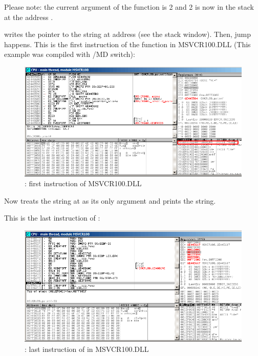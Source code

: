 Please note: the current argument of the function is 2 and 2 is now in the stack at the address .

\clearpage
\MOV writes the pointer to the string at address  (see the stack window).
Then, jump happens.
This is the first instruction of the \printf function in MSVCR100.DLL (This example was compiled with /MD switch): 

\begin{figure}[H]
\centering
\includegraphics[scale=\FigScale]{patterns/08_switch/1_few/olly6.png}
\caption{\olly: first instruction of \printf \InENRU MSVCR100.DLL}
\label{fig:switch_few_olly6}
\end{figure}

Now \printf treats the string at  as its only argument and prints the string.

\clearpage
This is the last instruction of \printf:

\begin{figure}[H]
\centering
\includegraphics[scale=\FigScale]{patterns/08_switch/1_few/olly7.png}
\caption{\olly: last instruction of \printf in MSVCR100.DLL}
\label{fig:switch_few_olly7}
\end{figure}

